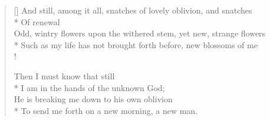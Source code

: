 \documentclass[MAIN]{subfiles}
\begin{document}
\begin{verse}[\versewidth]
And still, among it all, snatches of lovely oblivion, and snatches\\*
Of renewal\\
Odd, wintry flowers upon the withered stem, yet new, strange flowers\\*
Such as my life has not brought forth before, new blossoms of me\\!

Then I must know that still\\*
I am in the hands of the unknown God;\\
He is breaking me down to his own oblivion\\*
To send me forth on a new morning, a new man.
\end{verse}
\end{document}
